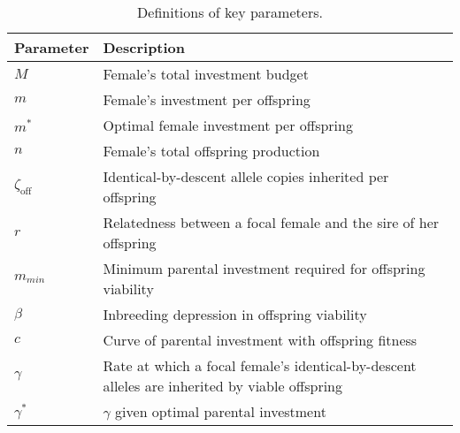 \documentclass[12pt]{article}
\begin{document}
\clearpage
\singlespacing
\begin{table}[H]
\begin{center}
\begin{tabular}{ll}
\hline
Parameter & Description & \\
\hline
$M$                     & Female's total investment budget  & \\
$m$                     & Female's investment per offspring & \\
$m^{*}$                 & Optimal female investment per offspring & \\
$n$                     & Female's total offspring production & \\
$\zeta_{\textrm{off}}$  & Identical-by-descent allele copies inherited per offspring & \\
$r$                     & Relatedness between a focal female and the sire of her offspring & \\
$m_{min}$               & Minimum parental investment required for offspring viability & \\
$\beta$                 & Inbreeding depression in offspring viability & \\
$c$                     & Curve of parental investment with offspring fitness & \\
$\gamma$                & Rate at which a focal female's identical-by-descent alleles are inherited by viable offspring & \\
$\gamma^{*}$            & $\gamma$ given optimal parental investment & \\
\hline	
\end{tabular}
\end{center}
\caption{Definitions of key parameters.}
\label{parameters}
\end{table}
\end{document}
